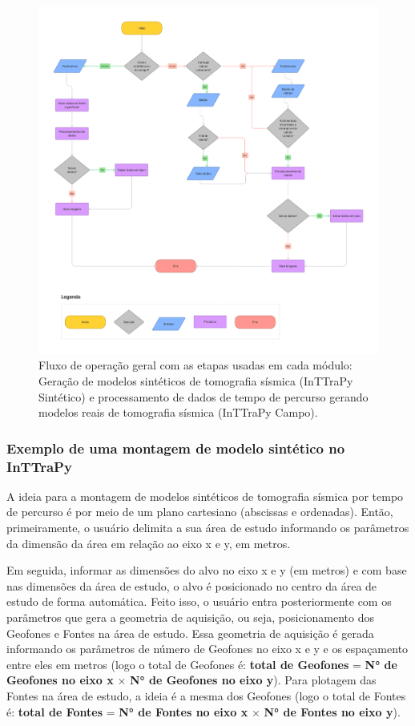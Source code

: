 \documentclass[a4paper, 12 pt]{article} %
\begin{document}
\begin{figure}[!hbtp]
	\begin{center}
		\includegraphics[scale=0.189]{Figuras/Portela_TCC.png}
	\end{center}
	\caption{Fluxo de operação geral com as etapas usadas em cada módulo: Geração de modelos sintéticos de tomografia sísmica (InTTraPy Sintético) e processamento de dados de tempo de percurso gerando modelos reais de tomografia sísmica (InTTraPy Campo).}
	\label{fluxo_grama}
\end{figure} 

\subsubsection{Exemplo de uma montagem de modelo sintético no InTTraPy}

A ideia para a montagem de modelos sintéticos de tomografia sísmica por tempo de percurso é por meio de um plano cartesiano (abscissas e ordenadas). Então, primeiramente, o usuário delimita a sua área de estudo informando os parâmetros da dimensão da área em relação ao eixo x e y, em metros. 

Em seguida, informar as dimensões do alvo no eixo x e y (em metros) e com base nas dimensões da área de estudo, o alvo é posicionado no centro da área de estudo de forma automática. Feito isso, o usuário entra posteriormente com os parâmetros que gera a geometria de aquisição, ou seja, posicionamento dos Geofones e Fontes na área de estudo. Essa geometria de aquisição é gerada informando os parâmetros de número de Geofones no eixo x e y e os espaçamento entre eles em metros (logo o total de Geofones é: \textbf{total de Geofones} = \textbf{N° de Geofones no eixo x} $\times$ \textbf{N° de Geofones no eixo y}). Para plotagem das Fontes na área de estudo, a ideia é a mesma dos Geofones (logo o total de Fontes é: \textbf{total de Fontes} = \textbf{N° de Fontes no eixo x} $\times$ \textbf{N° de Fontes no eixo y}). 
\end{document}
